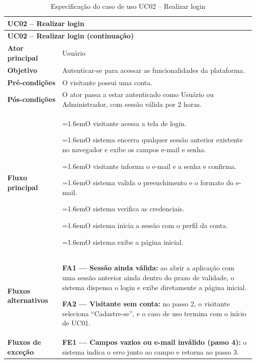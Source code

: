 \documentclass[12pt,a4paper]{article}
\newcommand{\ucitem}[2]{\par\noindent\hangindent=1.6em\hangafter=1\makebox[1.6em][l]{#1}#2}
\begin{document}
\begin{longtable}{|p{}|p{}|}
\caption{Especificação do caso de uso UC02 -- Realizar login}
\label{tab:uc02} \\
\hline
\multicolumn{2}{|l|}{\textbf{UC02 -- Realizar login}} \\
\hline
\endfirsthead

\hline
\multicolumn{2}{|l|}{\textbf{UC02 -- Realizar login (continuação)}} \\
\hline
\endhead

\hline
\endfoot
\textbf{Ator principal} & Usuário \\ \hline
\textbf{Objetivo} & Autenticar-se para acessar as funcionalidades da plataforma. \\ \hline
\textbf{Pré-condições} & O visitante possui uma conta. \\ \hline
\textbf{Pós-condições} & O ator passa a estar autenticado como Usuário ou Administrador, com sessão válida por 2 horas. \\ \hline
\textbf{Fluxo principal} &
\ucitem{1.}{O visitante acessa a tela de login.}
\ucitem{2.}{O sistema encerra qualquer sessão anterior existente no navegador e exibe os campos e-mail e senha.}
\ucitem{3.}{O visitante informa o e-mail e a senha e confirma.}
\ucitem{4.}{O sistema valida o preenchimento e o formato do e-mail.}
\ucitem{5.}{O sistema verifica as credenciais.}
\ucitem{6.}{O sistema inicia a sessão com o perfil da conta.}
\ucitem{7.}{O sistema exibe a página inicial.} \\ \hline
\textbf{Fluxos alternativos} &
\noindent \textbf{FA1 — Sessão ainda válida:} ao abrir a aplicação com uma sessão anterior ainda dentro do prazo de validade, o sistema dispensa o login e exibe diretamente a página inicial.
\par\smallskip\noindent \textbf{FA2 — Visitante sem conta:} no passo 2, o visitante seleciona ``Cadastre-se'', e o caso de uso termina com o início de UC01. \\ \hline
\textbf{Fluxos de exceção} &
\noindent \textbf{FE1 — Campos vazios ou e-mail inválido (passo 4):} o sistema indica o erro junto ao campo e retorna ao passo 3. \\ 
\end{longtable}
\end{document}
